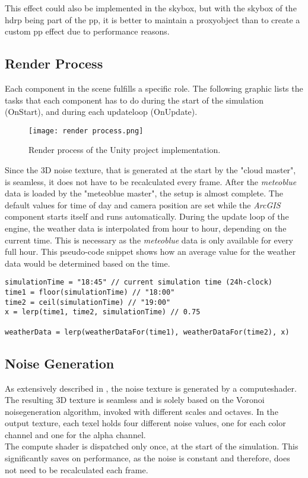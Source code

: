 \noindent
This effect could also be implemented in the skybox, but with the skybox of the \gls{hdrp} being part of the \gls{pp}, it is better to maintain a \gls{proxyobject} than to create a custom \gls{pp} effect due to performance reasons.

\clearpage

\subsection{Render Process}
\label{section:techimpl:process}
Each component in the scene fulfills a specific role. The following graphic lists the tasks that each component has to do during the start of the simulation (OnStart), and during each \gls{updateloop} (OnUpdate).

\begin{figure}[H]
    \texttt{[image: render process.png]}
    \caption{Render process of the Unity project implementation.}
\end{figure}

\noindent
Since the 3D \gls{noise} texture, that is generated at the start by the "cloud master", is seamless, it does not have to be recalculated every frame.
After the \emph{meteoblue} data is loaded by the "meteoblue master", the setup is almost complete.
The default values for time of day and camera position are set while the \emph{ArcGIS} component starts itself and runs automatically.
\emptyline
During the update loop of the engine, the weather data is interpolated from hour to hour, depending on the current time.
This is necessary as the \emph{meteoblue} data is only available for every full hour.
This pseudo-code snippet shows how an average value for the weather data would be determined based on the time.

\begin{lstlisting}[language=HLSL, caption=Pseudo-code for linear interpolation of weather data., label=lst:psuedo:weather:lerp]
simulationTime = "18:45" // current simulation time (24h-clock)
time1 = floor(simulationTime) // "18:00"
time2 = ceil(simulationTime) // "19:00"
x = lerp(time1, time2, simulationTime) // 0.75

weatherData = lerp(weatherDataFor(time1), weatherDataFor(time2), x)
\end{lstlisting}

\clearpage

\subsection{Noise Generation}
\label{section:techimpl:noise}
As extensively described in , the \gls{noise} texture is generated by a \gls{computeshader}.
The resulting 3D texture is seamless and is solely based on the Voronoi \gls{noisegeneration} algorithm, invoked with different scales and octaves.
In the output texture, each \gls{texel} holds four different \gls{noise} values, one for each color channel and one for the alpha channel.
\\
The compute shader is dispatched only once, at the start of the simulation.
This significantly saves on performance, as the \gls{noise} is constant and therefore, does not need to be recalculated each frame.

